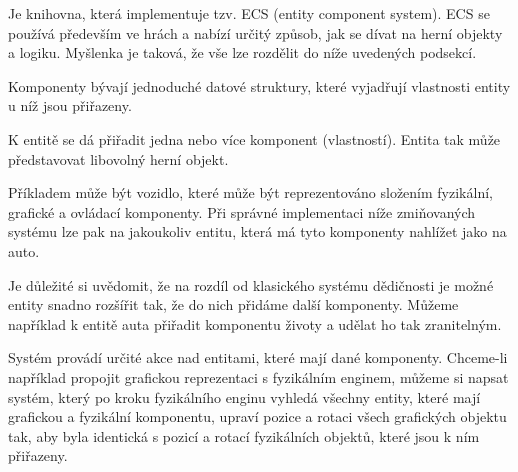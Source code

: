 \label{sec:ces}
Je knihovna, která implementuje tzv. ECS (entity component system). ECS se používá především ve hrách a nabízí určitý způsob, jak se dívat na herní objekty a logiku. Myšlenka je taková, že vše lze rozdělit do níže uvedených podsekcí.

Komponenty bývají jednoduché datové struktury, které vyjadřují vlastnosti entity u níž jsou přiřazeny.

K entitě se dá přiřadit jedna nebo více komponent (vlastností). Entita tak může představovat libovolný herní objekt. 

Příkladem může být vozidlo, které může být reprezentováno složením fyzikální, grafické a ovládací komponenty. Při správné implementaci níže zmiňovaných systému lze pak na jakoukoliv entitu, která má tyto komponenty nahlížet jako na auto.

Je důležité si uvědomit, že na rozdíl od klasického systému dědičnosti je možné entity snadno rozšířit tak, že do nich přidáme další komponenty. Můžeme například k entitě auta přiřadit komponentu životy a udělat ho tak zranitelným.

Systém provádí určité akce nad entitami, které mají dané komponenty. Chceme-li například propojit grafickou reprezentaci s fyzikálním enginem, můžeme si napsat systém, který po kroku fyzikálního enginu vyhledá všechny entity, které mají grafickou a fyzikální komponentu, upraví pozice a rotaci všech grafických objektu tak, aby byla identická s pozicí a rotací fyzikálních objektů, které jsou k ním přiřazeny.